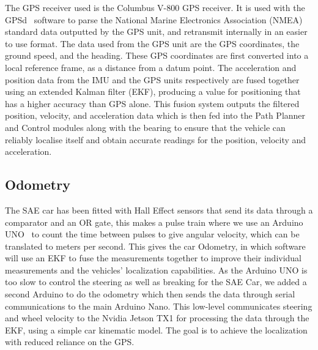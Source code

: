 The GPS receiver used is the Columbus V-800 GPS receiver. It is used with the GPSd~\cite{raymond_gpsd_nodate} software to parse the National Marine Electronics Association (NMEA) standard data outputted by the GPS unit, and retransmit internally in an easier to use format. The data used from the GPS unit are the GPS coordinates, the ground speed, and the heading.  These GPS coordinates are first converted into a local reference frame, as a distance from a datum point. 
The acceleration and position data from the IMU and the GPS units respectively are fused together using an extended Kalman filter (EKF), producing a value for positioning that has a higher accuracy than GPS alone. This fusion system outputs the filtered position, velocity, and acceleration data which is then fed into the Path Planner and Control modules along with the bearing to ensure that the vehicle can reliably localise itself and obtain accurate readings for the position, velocity and acceleration. 


\subsection{Odometry}
The SAE car has been fitted with Hall Effect sensors that send its data through a comparator and an OR gate, this makes a pulse train where we use an Arduino UNO~\cite{arduino_arduino_nodate} to count the time between pulses to give angular velocity, which can be translated to meters per second. This gives the car Odometry, in which software will use an EKF to fuse the measurements together to improve their individual measurements and the vehicles’ localization capabilities. As the Arduino UNO is too slow to control the steering as well as breaking for the SAE Car, we added a second Arduino to do the odometry which then sends the data through serial communications to the main Arduino Nano. This low-level communicates steering and wheel velocity to the Nvidia Jetson TX1 for processing the data through the EKF, using a simple car kinematic model. The goal is to achieve the localization with reduced reliance on the GPS.

